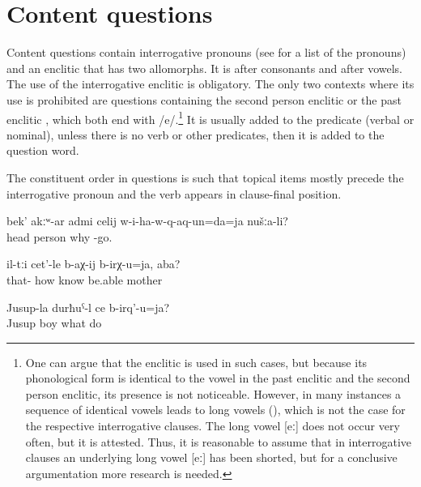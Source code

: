 
\section{Content questions}
\label{sec:Content questions}

Content questions contain interrogative pronouns (see  for a list of the pronouns) and an enclitic that has two allomorphs. It is  after consonants and  after vowels. The use of the interrogative enclitic is obligatory. The only two contexts where its use is prohibited are questions containing the second person enclitic  or the past enclitic , which both end with /e/.\footnote{One can argue that the enclitic  is used in such cases, but because its phonological form is identical to the vowel in the past enclitic and the second person enclitic, its presence is not noticeable. However, in many instances a sequence of identical vowels leads to long vowels (), which is not the case for the respective interrogative clauses. The long vowel [eː] does not occur very often, but it is attested. Thus, it is reasonable to assume that in interrogative clauses an underlying long vowel [eː] has been shorted, but for a conclusive argumentation more research is needed.} It is usually added to the predicate (verbal or nominal), unless there is no verb or other predicates, then it is added to the question word.

The constituent order in questions is such that topical items mostly precede the interrogative pronoun and the verb appears in clause-final position.
%
\begin{exe}
	\ex	\label{ex:‎Why did we send a man without a head there into (the cave)}
	\gll	bek'	akːʷ-ar	admi	celij	w-i-ha-w-q-aq-un=da=ja	nušːa-li?\\
		head		person	why	-go.	\\
	\glt	{}

	\ex	\label{ex:‎‎‎How can you get to know them, mother}
	\gll	il-tːi	cet'-le	b-aχ-ij	b-irχ-u=ja,	aba?\\
		that-	how	know	be.able	mother\\
	\glt	{}

	\ex	\label{ex:What does Jusup's son do}
	\gll	Jusup-la	durħuˁ-l	ce	b-irq'-u=ja?\\
		Jusup	boy	what	do\\
	\glt	{}
\end{exe}

